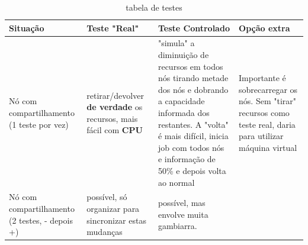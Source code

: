 \begin{table}
	\centering
	\begin{tabular}{|p{2.5cm}|p{4.0cm}|p{6.0cm}|p{2.5cm}|}
		\hline
		Situação & Teste "Real" & Teste Controlado & Opção extra\\
		\hline
		Nó com compartilhamento (1 teste por vez) & retirar/devolver \textbf{de verdade} os recursos, mais fácil com \textbf{CPU} & "simula" a diminuição de recursos em todos nós tirando metade dos nós e dobrando a capacidade informada dos restantes. A "volta" é mais difícil, inicia job com todos nós e informação de 50\% e depois volta ao normal & Importante é sobrecarregar os nós. Sem "tirar" recursos como teste real, daria para utilizar máquina virtual \\
		\hline
		Nó com compartilhamento (2 testes, - depois +) & possível, só organizar para sincronizar estas mudanças & possível, mas envolve muita gambiarra. & \\
		\hline
	\end{tabular}
	\caption{tabela de testes}
	\label{tab:memory allocation}
\end{table}